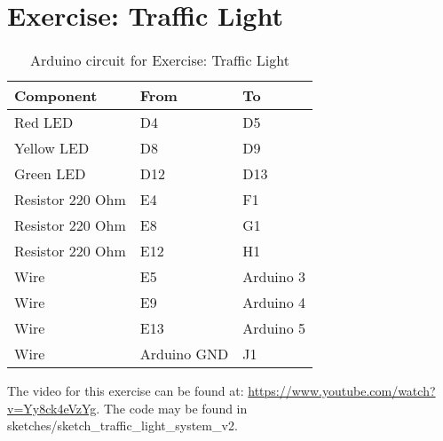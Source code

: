 \part*{Exercise: Traffic Light}
\begin{table}[H]
	\centering
	\caption{Arduino circuit for Exercise: Traffic Light}
	\label{my-label}
	\begin{tabular}{|l|l|l|}
		\hline
		Component        & From        & To        \\ \hline
		Red LED          & D4          & D5        \\ \hline
		Yellow LED       & D8          & D9        \\ \hline
		Green LED        & D12         & D13       \\ \hline
		Resistor 220 Ohm & E4          & F1        \\ \hline
		Resistor 220 Ohm & E8          & G1        \\ \hline
		Resistor 220 Ohm & E12         & H1        \\ \hline
		Wire             & E5          & Arduino 3 \\ \hline
		Wire             & E9          & Arduino 4 \\ \hline
		Wire             & E13         & Arduino 5 \\ \hline
		Wire             & Arduino GND & J1        \\ \hline
	\end{tabular}
\end{table}
The video for this exercise can be found at: \url{https://www.youtube.com/watch?v=Yy8ck4eVzYg}. The code may be found in sketches/sketch\_traffic\_light\_system\_v2.